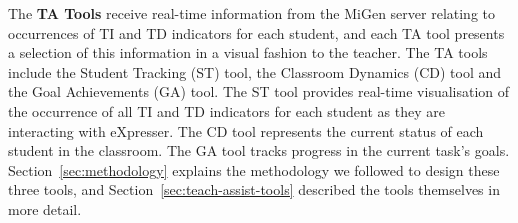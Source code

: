 The {\bf TA Tools}
receive real-time information from the MiGen server relating to
occurrences of TI and TD indicators for each student, and each TA tool
presents a selection of this information in a visual fashion to the
teacher. The TA tools include the Student Tracking (ST) tool, the
Classroom Dynamics (CD) tool and the Goal Achievements (GA) tool. The
ST tool provides real-time visualisation of the occurrence of all TI
and TD indicators for each student as they are interacting with
eXpresser. 
The CD tool represents the current status of each student in the
classroom. 
% 
The GA tool tracks progress in the current task's goals. 
Section~\ref{sec:methodology} explains the methodology we followed to
design these three tools, and Section~\ref{sec:teach-assist-tools}
described the tools themselves in more detail. 


